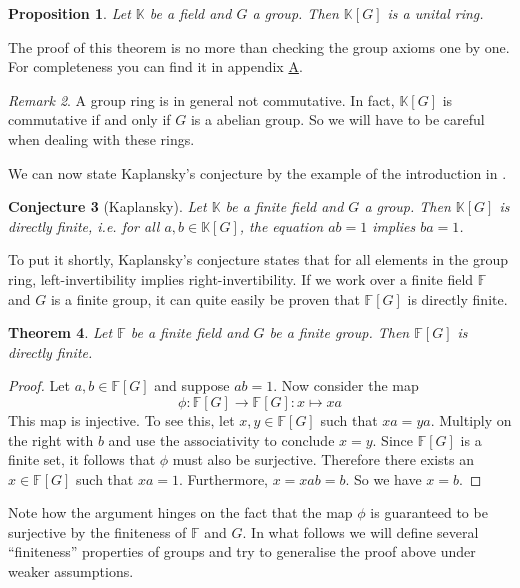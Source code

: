 \documentclass[titlepage, a4paper]{article}
\newcommand{\F}{\mathbb{F}}
\newtheorem{theorem}{Theorem}[section]
\newtheorem{proposition}[theorem]{Proposition}
\newtheorem{conjecture}[theorem]{Conjecture}
\theoremstyle{definition}
\theoremstyle{remark}
\newtheorem{remark}[theorem]{Remark}
\begin{document}
\begin{proposition}
    Let $\mathbb K$ be a field and $G$ a group. Then $\mathbb K[G]$ is a unital ring.
\end{proposition}
The proof of this theorem is no more than checking the group axioms one by one. For completeness you can find it in appendix \hyperlink{sec:proof_groupring}{A}.

\begin{remark}
	A group ring is in general not commutative. In fact, $\mathbb{K}[G]$ is commutative if and only if $G$ is a abelian group. So we will have to be careful when dealing with these rings. 
\end{remark}

We can now state Kaplansky's conjecture by the example of the introduction in \cite{elek_szabo_2003}.

\begin{conjecture}[Kaplansky]
	Let $\mathbb K$ be a finite field and $G$ a group. Then $\mathbb K[G]$ is directly finite, i.e. for all $a, b \in \mathbb K[G]$, the equation $ab=1$ implies $ba=1$.
\end{conjecture}

To put it shortly, Kaplansky's conjecture states that for all elements in the group ring, left-invertibility implies right-invertibility. If we work over a finite field $\F$ and $G$ is a finite group, it can quite easily be proven that $\F[G]$ is directly finite.

\begin{theorem}
    Let $\F$ be a finite field and $G$ be a finite group. Then $\F[G]$ is directly finite. 
\end{theorem}
\begin{proof}
    Let $a, b \in \mathbb F[G]$ and suppose $ab=1$. Now consider the map
    \[
        \phi: \mathbb F[G] \to \mathbb F[G]: x \mapsto x a
    \]
    This map is injective. To see this, let $x, y \in \mathbb F[G]$ such that $xa=ya$. Multiply on the right with $b$ and use the associativity to conclude $x=y$.
    Since $\mathbb F[G]$ is a finite set, it follows that $\phi$ must also be surjective. Therefore there exists an $x \in \mathbb F[G]$ such that $x a = 1$. Furthermore, $x = xab = b$. So we have $x = b$.
\end{proof}

Note how the argument hinges on the fact that the map $\phi$ is guaranteed to be surjective by the finiteness of $\mathbb F$ and $G$. In what follows we will define several ``finiteness'' properties of groups and try to generalise the proof above under weaker assumptions.
\end{document}
